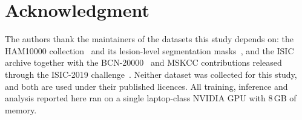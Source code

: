\documentclass[journal]{IEEEtran}
\begin{document}
\section*{Acknowledgment}
The authors thank the maintainers of the datasets this study depends on: the
HAM10000 collection~\cite{tschandl2018ham10000} and its lesion-level segmentation
masks~\cite{tschandl2020segmentations}, and the ISIC archive together with the
BCN-20000~\cite{combalia2019bcn20000} and MSKCC contributions released through the ISIC-2019
challenge~\cite{codella2018isic}. Neither dataset was collected for this study, and both are
used under their published licences. All training, inference and analysis reported here ran on
a single laptop-class NVIDIA GPU with $8$\,GB of memory.
\end{document}
